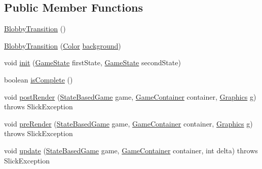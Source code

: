 \subsection*{Public Member Functions}
\begin{DoxyCompactItemize}
\item 
\mbox{\hyperlink{classorg_1_1newdawn_1_1slick_1_1state_1_1transition_1_1_blobby_transition_ac9069f2c3633b03ab0b4e5309423b38b}{Blobby\+Transition}} ()
\item 
\mbox{\hyperlink{classorg_1_1newdawn_1_1slick_1_1state_1_1transition_1_1_blobby_transition_af530407861497a189e84e9027ffe0b3a}{Blobby\+Transition}} (\mbox{\hyperlink{classorg_1_1newdawn_1_1slick_1_1_color}{Color}} \mbox{\hyperlink{classorg_1_1newdawn_1_1slick_1_1state_1_1transition_1_1_blobby_transition_a53b1caa1a2eccd2cbb1a5d46b3f2c95b}{background}})
\item 
void \mbox{\hyperlink{classorg_1_1newdawn_1_1slick_1_1state_1_1transition_1_1_blobby_transition_ac28ad95ee1406c3969f3962189e07e26}{init}} (\mbox{\hyperlink{interfaceorg_1_1newdawn_1_1slick_1_1state_1_1_game_state}{Game\+State}} first\+State, \mbox{\hyperlink{interfaceorg_1_1newdawn_1_1slick_1_1state_1_1_game_state}{Game\+State}} second\+State)
\item 
boolean \mbox{\hyperlink{classorg_1_1newdawn_1_1slick_1_1state_1_1transition_1_1_blobby_transition_a432cd75d9e001f112dce00002228f587}{is\+Complete}} ()
\item 
void \mbox{\hyperlink{classorg_1_1newdawn_1_1slick_1_1state_1_1transition_1_1_blobby_transition_a9aa4c5f2238ca92dabd30690db9ef544}{post\+Render}} (\mbox{\hyperlink{classorg_1_1newdawn_1_1slick_1_1state_1_1_state_based_game}{State\+Based\+Game}} game, \mbox{\hyperlink{classorg_1_1newdawn_1_1slick_1_1_game_container}{Game\+Container}} container, \mbox{\hyperlink{classorg_1_1newdawn_1_1slick_1_1_graphics}{Graphics}} g)  throws Slick\+Exception 
\item 
void \mbox{\hyperlink{classorg_1_1newdawn_1_1slick_1_1state_1_1transition_1_1_blobby_transition_a0846a3ff8130ea47883069f622f644ec}{pre\+Render}} (\mbox{\hyperlink{classorg_1_1newdawn_1_1slick_1_1state_1_1_state_based_game}{State\+Based\+Game}} game, \mbox{\hyperlink{classorg_1_1newdawn_1_1slick_1_1_game_container}{Game\+Container}} container, \mbox{\hyperlink{classorg_1_1newdawn_1_1slick_1_1_graphics}{Graphics}} g)  throws Slick\+Exception 
\item 
void \mbox{\hyperlink{classorg_1_1newdawn_1_1slick_1_1state_1_1transition_1_1_blobby_transition_aaa0d8b8dcc426ac891d25778066c4fcd}{update}} (\mbox{\hyperlink{classorg_1_1newdawn_1_1slick_1_1state_1_1_state_based_game}{State\+Based\+Game}} game, \mbox{\hyperlink{classorg_1_1newdawn_1_1slick_1_1_game_container}{Game\+Container}} container, int delta)  throws Slick\+Exception 
\end{DoxyCompactItemize}
